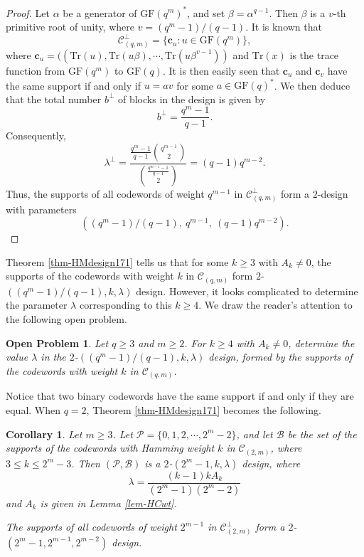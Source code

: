 \documentclass[1p,final]{elsarticle}
\newtheorem{corollary}[theorem]{Corollary}
\newtheorem{open}{Open Problem}
\newcommand{\tr}{{\mathrm{Tr}}}
\newcommand{\gf}{{\mathrm{GF}}}
\newcommand{\cP}{{\mathcal{P}}}
\newcommand{\cB}{{\mathcal{B}}}
\newcommand{\C}{{\mathcal{C}}}
\newcommand{\bc}{{\mathbf{c}}}
\begin{document}
\begin{proof}
Let $\alpha$ be a generator of $\gf(q^m)^*$, and set $\beta=\alpha^{q-1}$. 
Then $\beta$ is a $v$-th primitive root of unity, where $v=(q^m-1)/(q-1)$. 
It is known that 
$$ 
\C_{(q,m)}^\perp=\{\bc_u: u \in \gf(q^m)\},   
$$ 
where $\bc_u=((\tr(u), \tr(u\beta), \cdots, \tr(u\beta^{v-1}))$ and $\tr(x)$ 
is the trace function from $\gf(q^m)$ to $\gf(q)$. It is then easily seen that 
$\bc_{u}$ and $\bc_{v}$ have the same support if and only if $u=av$ for some 
$a \in \gf(q)^*$. We then deduce that the total number $b^\perp$ of blocks in the design 
is given by 
$$ 
b^\perp = \frac{q^m-1}{q-1}. 
$$ 
Consequently, 
$$ 
\lambda^\perp = \frac{\frac{q^m-1}{q-1} \binom{q^{m-1}}{2}}{\binom{\frac{q^{m-1}-1}{q-1}}{2}} 
=(q-1)q^{m-2}. 
$$ 
Thus, the supports of all codewords of weight $q^{m-1}$ in 
$\C_{(q,m)}^\perp$ form a $2$-design with parameters 
$$
\left((q^m-1)/(q-1), \ q^{m-1}, \ (q-1)q^{m-2} \right). 
$$
\end{proof} 


Theorem \ref{thm-HMdesign171} tells us that for some $k \geq 3$ with $A_k \neq 0$, the 
supports of the codewords with weight $k$ in $\C_{(q,m)}$ form $2$-$((q^m-1)/(q-1), k, 
\lambda)$ design. However, it looks complicated to determine the parameter $\lambda$ 
corresponding to this $k \geq 4$. We draw the reader's attention to the following open problem.  

\begin{open} 
Let $q \geq 3$ and $m \geq 2$. For $k \geq 4$ with $A_k \neq 0$, determine the value $\lambda$ in the 
$2$-$((q^m-1)/(q-1), k, \lambda)$ design, formed by the supports of the codewords with 
weight $k$ in $\C_{(q,m)}$. 
\end{open} 

Notice that two binary codewords have the same support if and only if they are equal. 
When $q=2$, Theorem \ref{thm-HMdesign171} becomes the following. 

\begin{corollary}\label{cor-HMdesign171} 
Let $m \geq 3$. Let $\cP=\{0,1,2, \cdots, 2^m-2\}$, and let $\cB$ be  the set of the supports 
of the codewords with Hamming weight $k$ in $\C_{(2,m)}$, where $3 \leq k \leq 2^m-3$. 
Then $(\cP, \cB)$ is a $2$-$(2^m-1, k, \lambda)$ design, where 
$$ 
\lambda=\frac{(k-1)kA_k}{(2^m-1)(2^m-2)}  
$$ 
and $A_k$ is given in Lemma \ref{lem-HCwt}.  

The supports of all codewords of weight $2^{m-1}$ in $\C_{(2,m)}^\perp$ form a 
$2$-$(2^m-1, 2^{m-1}, 2^{m-2})$ design. 
\end{corollary} 
\end{document}
